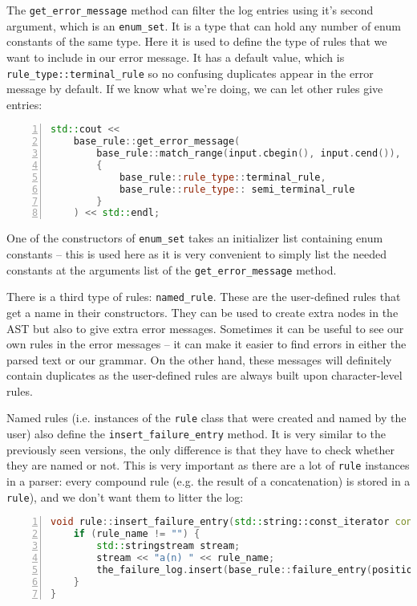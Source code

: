 \documentclass[12pt]{article}
\begin{document}
The \texttt{get\_error\_message} method can filter the log entries using it's second argument, which is an
\texttt{enum\_set}. It is a type that can hold any number of enum constants of the same type. Here it is used
to define the type of rules that we want to include in our error message. It has a default value, which is
\texttt{rule\_type::terminal\_rule} so no confusing duplicates appear in the error message by default. If we
know what we're doing, we can let other rules give entries:

\begin{center}
	\begin{minipage}[ht]{0.9\textwidth}
		\begin{lstlisting}[language=C++, breaklines=true, numbers=left]
std::cout <<
	base_rule::get_error_message(
		base_rule::match_range(input.cbegin(), input.cend()),
		{
			base_rule::rule_type::terminal_rule,
			base_rule::rule_type:: semi_terminal_rule
		}
	) << std::endl; 
		\end{lstlisting}
	\end{minipage}
\end{center}

One of the constructors of \texttt{enum\_set} takes an initializer list containing enum constants -- this is
used here as it is very convenient to simply list the needed constants at the arguments list of the
\texttt{get\_error\_message} method.

There is a third type of rules: \texttt{named\_rule}. These are the user-defined rules that get a name in
their constructors. They can be used to create extra nodes in the AST but also to give extra error messages.
Sometimes it can be useful to see our own rules in the error messages -- it can make it easier to find errors
in either the parsed text or our grammar. On the other hand, these messages will definitely contain duplicates
as the user-defined rules are always built upon character-level rules.

Named rules (i.e. instances of the \texttt{rule} class that were created and named by the user) also define
the \texttt{insert\_failure\_entry} method. It is very similar to the previously seen versions, the only
difference is that they have to check whether they are named or not. This is very important as there are a lot
of \texttt{rule} instances in a parser: every compound rule (e.g. the result of a concatenation) is stored in
a \texttt{rule}), and we don't want them to litter the log:
\begin{center}
	\begin{minipage}[ht]{0.9\textwidth}
		\begin{lstlisting}[language=C++, breaklines=true, numbers=left]
void rule::insert_failure_entry(std::string::const_iterator const &position) const {
	if (rule_name != "") {
		std::stringstream stream;
		stream << "a(n) " << rule_name;
		the_failure_log.insert(base_rule::failure_entry(position, base_rule::rule_type::named_rule, stream.str()));	
	}
}
		\end{lstlisting}
	\end{minipage}
\end{center}
\end{document}
